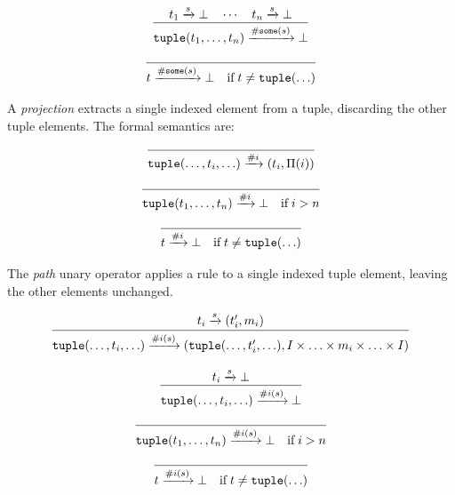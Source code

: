 \begin{equation}
\infer
  {\mathtt{tuple}(t_1,\ldots,t_n) \arr{\mathtt{\#some}(s)} \bot}
  {t_1 \arr{s} \bot \quad \cdots \quad t_n \arr{s} \bot}
\end{equation}

\begin{equation}
\infer
  {t \arr{\mathtt{\#some}(s)} \bot
  \quad\mbox{if}\; t \neq \mathtt{tuple}(\ldots)}
  {}  
\end{equation}


A \emph{projection} extracts a single indexed element from a
tuple, discarding the other tuple elements. The formal semantics
are:

\begin{equation}
\infer
  {\mathtt{tuple}(\ldots,t_i,\ldots) \arr{\#i} (t_i,\Pi(i))}
  {}  
\end{equation}

\begin{equation}
\infer
  {\mathtt{tuple}(t_1,\ldots,t_n) \arr{\#i} \bot
  \quad\mbox{if}\; i > n}
  {}  
\end{equation}

\begin{equation}
\infer
  {t \arr{\#i} \bot
  \quad\mbox{if}\; t \neq \mathtt{tuple}(\ldots)}
  {}  
\end{equation}

The \emph{path} unary operator applies a rule to a single
indexed tuple element, leaving the other elements unchanged.

\begin{equation}
\infer
  {\mathtt{tuple}(\ldots,t_i,\ldots) \arr{\#i(s)} (\mathtt{tuple}(\ldots,t_i',\ldots), I \times \ldots \times m_i \times \ldots \times I)}
  {t_i \arr{s} (t_i',m_i)}
\end{equation}

\begin{equation}
\infer
  {\mathtt{tuple}(\ldots,t_i,\ldots) \arr{\#i(s)} \bot}
  {t_i \arr{s} \bot}
\end{equation}

\begin{equation}
\infer
  {\mathtt{tuple}(t_1,\ldots,t_n) \arr{\#i(s)} \bot
  \quad\mbox{if}\; i > n}
  {}  
\end{equation}

\begin{equation}
\infer
  {t \arr{\#i(s)} \bot
  \quad\mbox{if}\; t \neq \mathtt{tuple}(\ldots)}
  {}  
\end{equation}

